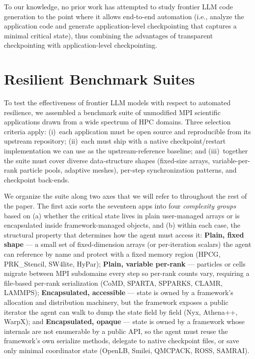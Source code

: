 \documentclass[conference]{IEEEtran}
\begin{document}
To our knowledge, no prior work has attempted to study frontier LLM code generation to the point where it allows end-to-end automation (i.e., analyze the application code and generate application-level checkpointing that captures a minimal critical state), thus combining the advantages of transparent checkpointing with application-level checkpointing.

\section{Resilient Benchmark Suites}
\label{sec:suite}

To test the effectiveness of frontier LLM models with respect to automated resilience, we assembled a benchmark suite of unmodified MPI scientific applications drawn from a wide spectrum of HPC domains. Three selection criteria apply: (i)~each application must be open source and reproducible from its upstream repository; (ii)~each must ship with a native checkpoint/restart implementation we can use as the upstream-reference baseline; and (iii)~together the suite must cover diverse data-structure shapes (fixed-size arrays, variable-per-rank particle pools, adaptive meshes), per-step synchronization patterns, and checkpoint back-ends.

We organize the suite along two axes that we will refer to throughout the rest of the paper. The first axis sorts the seventeen apps into four \emph{complexity groups} based on (a) whether the critical state lives in plain user-managed arrays or is encapsulated inside framework-managed objects, and (b) within each case, the structural property that determines how the agent must access it: \textbf{Plain, fixed shape} --- a small set of fixed-dimension arrays (or per-iteration scalars) the agent can reference by name and protect with a fixed memory region (HPCG, PRK\_Stencil, SW4lite, HyPar); \textbf{Plain, variable per-rank} --- particles or cells migrate between MPI subdomains every step so per-rank counts vary, requiring a file-based per-rank serialization (CoMD, SPARTA, SPPARKS, CLAMR, LAMMPS); \textbf{Encapsulated, accessible} --- state is owned by a framework's allocation and distribution machinery, but the framework exposes a public iterator the agent can walk to dump the state field by field (Nyx, Athena++, WarpX); and \textbf{Encapsulated, opaque} --- state is owned by a framework whose internals are not enumerable by a public API, so the agent must reuse the framework's own serialize methods, delegate to native checkpoint files, or save only minimal coordinator state (OpenLB, Smilei, QMCPACK, ROSS, SAMRAI).
\end{document}
